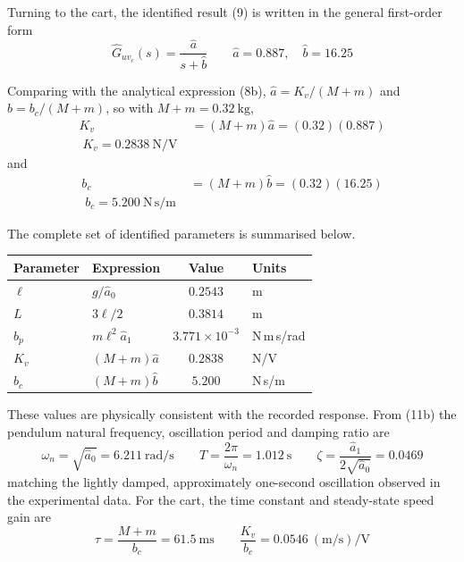 \documentclass[11pt,a4paper]{article}
\begin{document}
Turning to the cart, the identified result (9) is written in the general
first-order form
\begin{equation*}
	\hat{G}_{uv_{c}}(s) = \frac{\hat{a}}{s + \hat{b}}
	\qquad
	\hat{a} = 0.887, \quad \hat{b} = 16.25
	\tag{20}
\end{equation*}

Comparing with the analytical expression (8b), $\hat{a} = K_{v}/(M+m)$ and
$\hat{b} = b_{c}/(M+m)$, so with $M + m = 0.32~\mathrm{kg}$,
\begin{align*}
	K_{v} &= \left( M + m \right) \hat{a}
	= \left( 0.32 \right)\left( 0.887 \right) \\
	\boxed{\; K_{v} = 0.2838~\mathrm{N/V} \;} \tag{21}
\end{align*}
and
\begin{align*}
	b_{c} &= \left( M + m \right) \hat{b}
	= \left( 0.32 \right)\left( 16.25 \right) \\
	\boxed{\; b_{c} = 5.200~\mathrm{N\,s/m} \;} \tag{22}
\end{align*}

The complete set of identified parameters is summarised below.

\begin{center}
\begin{tabular}{|l|l|c|l|}
\hline
\textbf{Parameter} & \textbf{Expression} & \textbf{Value} & \textbf{Units}\\
\hline
$\ell$ & $g/\hat{a}_{0}$          & $0.2543$               & m \\ \hline
$L$    & $3\ell/2$                & $0.3814$               & m \\ \hline
$b_{p}$& $m\ell^{2}\hat{a}_{1}$   & $3.771\times10^{-3}$   & N\,m\,s/rad \\ \hline
$K_{v}$& $\left(M+m\right)\hat{a}$& $0.2838$               & N/V \\ \hline
$b_{c}$& $\left(M+m\right)\hat{b}$& $5.200$                & N\,s/m \\ \hline
\end{tabular}
\end{center}

These values are physically consistent with the recorded response. From
(11b) the pendulum natural frequency, oscillation period and damping ratio
are
\begin{equation*}
	\omega_{n} = \sqrt{\hat{a}_{0}} = 6.211~\mathrm{rad/s}
	\qquad
	T = \frac{2\pi}{\omega_{n}} = 1.012~\mathrm{s}
	\qquad
	\zeta = \frac{\hat{a}_{1}}{2\sqrt{\hat{a}_{0}}} = 0.0469
	\tag{23}
\end{equation*}
matching the lightly damped, approximately one-second oscillation observed
in the experimental data. For the cart, the time constant and steady-state
speed gain are
\begin{equation*}
	\tau = \frac{M+m}{b_{c}} = 61.5~\mathrm{ms}
	\qquad
	\frac{K_{v}}{b_{c}} = 0.0546~\mathrm{(m/s)/V}
	\tag{24}
\end{equation*}
\end{document}
